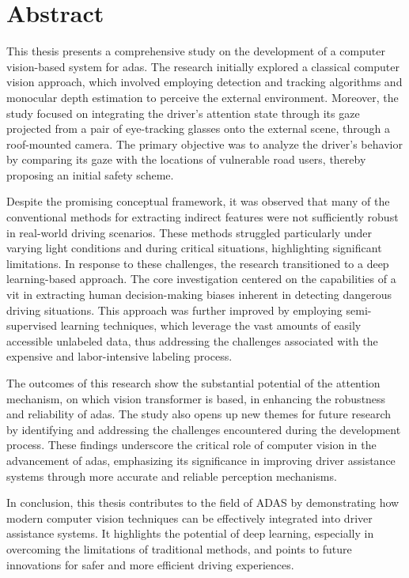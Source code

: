 \thispagestyle{empty}
\section*{Abstract}
\vspace{0.5cm}
This thesis presents a comprehensive study on the development of a computer 
vision-based system for \acf{adas}. The research 
initially explored a classical computer vision approach, which involved 
employing detection and tracking algorithms and monocular depth estimation
to perceive the external environment. Moreover, the study focused on 
integrating the driver’s attention state through its gaze projected from a pair 
of eye-tracking glasses onto the external scene, through a roof-mounted camera.
The primary objective was to analyze the driver's behavior by comparing 
its gaze with the locations of vulnerable road users, thereby proposing 
an initial safety scheme.

Despite the promising conceptual framework, it was observed that many of the 
conventional methods for extracting indirect features were not sufficiently 
robust in real-world driving scenarios. These methods struggled particularly 
under varying light conditions and during critical situations, highlighting 
significant limitations. In response to these challenges, the research 
transitioned to a deep learning-based approach. The core investigation centered 
on the capabilities of a \acf{vit} in extracting human decision-making 
biases inherent in detecting dangerous driving situations.
This approach was further improved by 
employing semi-supervised learning techniques, which leverage the 
vast amounts of easily accessible unlabeled data, thus 
addressing the challenges associated with the expensive and labor-intensive 
labeling process.

The outcomes of this research show the substantial potential of 
the attention mechanism, on which vision transformer is based, in enhancing 
the robustness 
and reliability of \acs{adas}. The study also opens up new themes for future 
research by identifying and addressing the challenges encountered during the 
development process. These findings underscore the critical role of computer 
vision in the advancement of \acs{adas}, emphasizing its significance in improving 
driver assistance systems through more accurate and reliable perception 
mechanisms.

In conclusion, this thesis contributes to the field of ADAS by demonstrating 
how modern computer vision techniques can be effectively integrated into driver 
assistance systems. It highlights the potential of deep 
learning, especially in overcoming the limitations of traditional methods, and 
points to future innovations for safer and more 
efficient driving experiences.

\afterpage{\blankpage}
